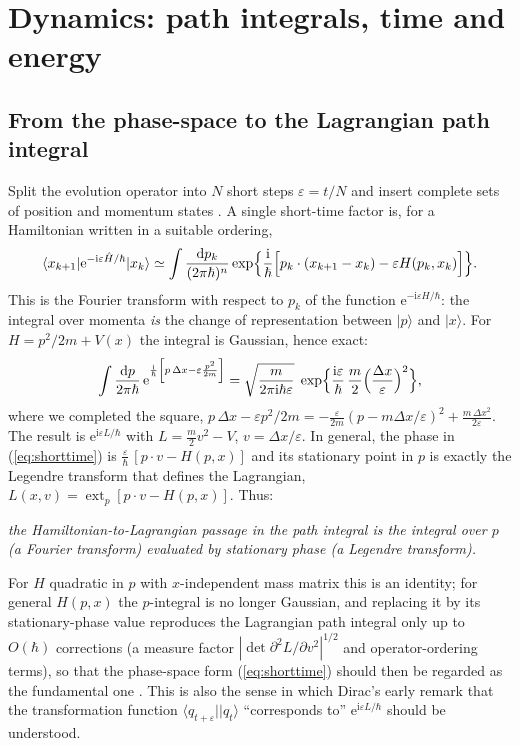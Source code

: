 \documentclass[11pt,a4paper]{article}
\newcommand{\ii}{\mathrm{i}}
\newcommand{\dd}{\mathrm{d}}
\newcommand{\ee}{\mathrm{e}}
\newcommand{\hb}{\hbar}
\newcommand{\op}[1]{\hat{#1}}
\newcommand{\ext}{\operatorname*{ext}}
\newcommand{\bra}[1]{\langle #1|}
\newcommand{\ket}[1]{|#1\rangle}
\theoremstyle{plain}
\theoremstyle{definition}
\theoremstyle{remark}
\begin{document}
\section{Dynamics: path integrals, time and energy}

\subsection{From the phase-space to the Lagrangian path integral}

Split the evolution operator into $N$ short steps $\varepsilon=t/N$ and insert complete sets of position and momentum states \cite{Feynman48,FeynmanHibbs,Schulman}. A single short-time factor is, for a Hamiltonian written in a suitable ordering,
\begin{equation}\label{eq:shorttime}
\bra{x_{k+1}}\ee^{-\ii\varepsilon\op H/\hb}\ket{x_k}\simeq\int\frac{\dd p_k}{(2\pi\hb)^n}\exp\Bigl\{\frac{\ii}{\hb}\Bigl[p_k\cdot(x_{k+1}-x_k)-\varepsilon H(p_k,x_k)\Bigr]\Bigr\}.
\end{equation}
This is the Fourier transform with respect to $p_k$ of the function $\ee^{-\ii\varepsilon H/\hb}$: the integral over momenta \emph{is} the change of representation between $\ket p$ and $\ket x$. For $H=p^2/2m+V(x)$ the integral is Gaussian, hence exact:
\begin{equation}
\int\frac{\dd p}{2\pi\hb}\,\ee^{\frac{\ii}{\hb}\left[p\,\Delta x-\varepsilon\frac{p^2}{2m}\right]}=\sqrt{\frac{m}{2\pi\ii\hb\varepsilon}}\;\exp\Bigl\{\frac{\ii\varepsilon}{\hb}\,\frac{m}{2}\Bigl(\frac{\Delta x}{\varepsilon}\Bigr)^2\Bigr\},
\end{equation}
where we completed the square, $p\,\Delta x-\varepsilon p^2/2m=-\frac{\varepsilon}{2m}(p-m\Delta x/\varepsilon)^2+\frac{m\,\Delta x^2}{2\varepsilon}$. The result is $\ee^{\ii\varepsilon L/\hb}$ with $L=\tfrac m2v^2-V$, $v=\Delta x/\varepsilon$. In general, the phase in (\ref{eq:shorttime}) is $\tfrac{\varepsilon}{\hb}\,[p\cdot v-H(p,x)]$ and its stationary point in $p$ is exactly the Legendre transform that defines the Lagrangian, $L(x,v)=\ext_p[p\cdot v-H(p,x)]$. Thus:
\begin{center}
\emph{the Hamiltonian-to-Lagrangian passage in the path integral is the integral over $p$ (a Fourier transform) evaluated by stationary phase (a Legendre transform).}
\end{center}
For $H$ quadratic in $p$ with $x$-independent mass matrix this is an identity; for general $H(p,x)$ the $p$-integral is no longer Gaussian, and replacing it by its stationary-phase value reproduces the Lagrangian path integral only up to $O(\hb)$ corrections (a measure factor $|\det\partial^2L/\partial v^2|^{1/2}$ and operator-ordering terms), so that the phase-space form (\ref{eq:shorttime}) should then be regarded as the fundamental one \cite{Feynman48,Schulman}. This is also the sense in which Dirac's early remark that the transformation function $\bra{q_{t+\varepsilon}}\ket{q_t}$ ``corresponds to'' $\ee^{\ii\varepsilon L/\hb}$ \cite{Dirac33} should be understood.
\end{document}
